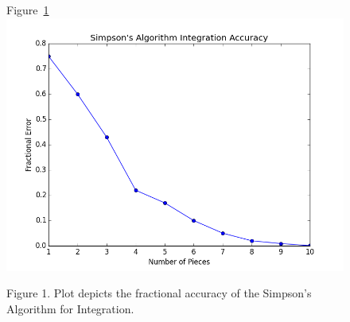 \documentclass{article}
\begin{document}
\begin{figure}[ht]
\begin{center}
{\sc Figure~\ref{fig:figure_1}}
\linebreak
\linebreak
\includegraphics[scale=0.5]{figure_1.png}
\end{center}{
\footnotesize {\sc Figure 1.} Plot depicts the fractional accuracy of the Simpson's Algorithm for Integration.}
\label{fig:figure_1}
\end{figure}
\end{document}
